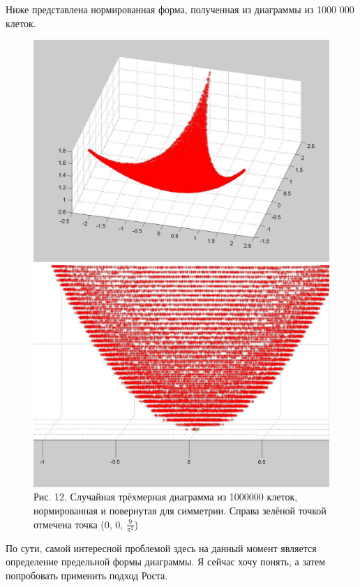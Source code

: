 \documentclass[12pt]{report}
\begin{document}
Ниже представлена нормированная форма, полученная из диаграммы из 1000 000 клеток.
\begin{figure}[!ht]
\begin{center}
\includegraphics[scale=0.2]{Assymptotic1000000.jpg}
\includegraphics[scale=0.2]{Assymptotic9pi}
\\Рис. 12. Случайная трёхмерная диаграмма из 1000000 клеток, нормированная и повернутая для симметрии. Справа зелёной точкой отмечена точка (0, 0, $\frac{9}{\pi^2}$)
\end{center}
\end{figure}

По сути, самой интересной проблемой здесь на данный момент является определение предельной формы диаграммы. Я сейчас хочу понять, а затем попробовать применить подход Роста.
\end{document}

